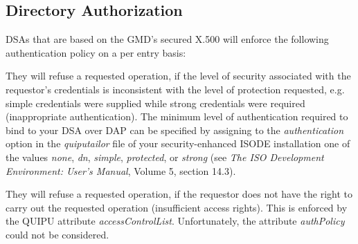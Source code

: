 \subsection{Directory Authorization}
DSAs that are based on the GMD's secured X.500 will enforce the following authentication policy 
on a per entry basis:
\bi

\m They will refuse a requested operation, if the level of security associated with the
   requestor's credentials is inconsistent with the level of protection requested, e.g.
   simple credentials were supplied while strong credentials were required
   (inappropriate authentication).
   The minimum level of authentication required to bind to your DSA over DAP can be
   specified by assigning to the {\em authentication} option in the {\em quiputailor} file of your 
   security-enhanced ISODE installation one of the values {\em none}, {\em dn}, {\em simple}, 
   {\em protected}, or {\em strong} (see {\em The ISO Development Environment: User's Manual}, 
   Volume 5, section 14.3).

\m They will refuse a requested operation, if the requestor does not have the right
   to carry out the requested operation (insufficient access rights). This is
   enforced by the QUIPU attribute {\em accessControlList}. Unfortunately, the attribute {\em authPolicy}
   could not be considered.
\ei


